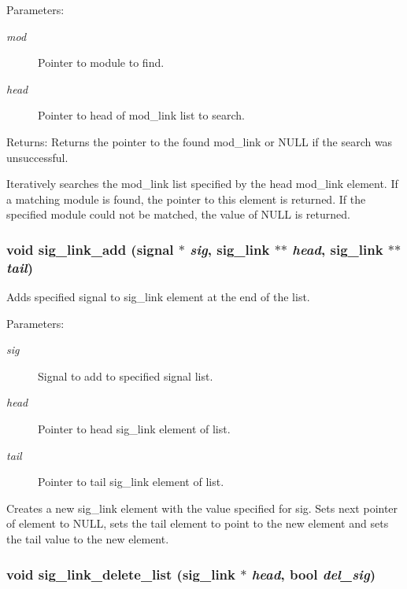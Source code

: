 \begin{Desc}
\item[Parameters:]
\begin{description}
\item[{\em mod}]Pointer to module to find. \item[{\em head}]Pointer to head of mod\_\-link list to search.\end{description}
\end{Desc}
\begin{Desc}
\item[Returns:]Returns the pointer to the found mod\_\-link or NULL if the search was unsuccessful.\end{Desc}
Iteratively searches the mod\_\-link list specified by the head mod\_\-link element. If a matching module is found, the pointer to this element is returned. If the specified module could not be matched, the value of NULL is returned. 
\subsubsection{\setlength{\rightskip}{0pt plus 5cm}void sig\_\-link\_\-add ({\bf signal} $\ast$ {\em sig}, {\bf sig\_\-link} $\ast$$\ast$ {\em head}, {\bf sig\_\-link} $\ast$$\ast$ {\em tail})}\label{link_8h_a4}


Adds specified signal to sig\_\-link element at the end of the list. 

\begin{Desc}
\item[Parameters:]
\begin{description}
\item[{\em sig}]Signal to add to specified signal list. \item[{\em head}]Pointer to head sig\_\-link element of list. \item[{\em tail}]Pointer to tail sig\_\-link element of list.\end{description}
\end{Desc}
Creates a new sig\_\-link element with the value specified for sig. Sets next pointer of element to NULL, sets the tail element to point to the new element and sets the tail value to the new element. 
\subsubsection{\setlength{\rightskip}{0pt plus 5cm}void sig\_\-link\_\-delete\_\-list ({\bf sig\_\-link} $\ast$ {\em head}, {\bf bool} {\em del\_\-sig})}\label{link_8h_a21}


